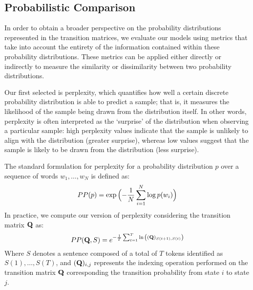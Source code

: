 \subsection{Probabilistic Comparison}\label{ssec:method_fom_prob}

In order to obtain a broader perspective on the probability distributions represented in the transition matrices, we evaluate our models using metrics that take into account the entirety of the information contained within these probability distributions.
These metrics can be applied either directly or indirectly to measure the similarity or dissimilarity between two probability distributions.

Our first selected is perplexity, which quantifies how well a certain discrete probability distribution is able to predict a sample; that is, it measures the likelihood of the sample being drawn from the distribution itself.
In other words, perplexity is often interpreted as the `surprise' of the distribution when observing a particular sample: high perplexity values indicate that the sample is unlikely to align with the distribution (greater surprise), whereas low values suggest that the sample is likely to be drawn from the distribution (less surprise).

The standard formulation for perplexity for a probability distribution $p$ over a sequence of words $w_1,\dots,w_N$ is defined as:
\begin{equation}
    \label{eq:method_fom_perplexity-base}
    PP(p) = \exp{\Bigl(-\frac{1}{N}\sum_{i=1}^{N}{\log{p(w_i)}}\Bigr)}
\end{equation}
In practice, we compute our version of perplexity considering the transition matrix $\bm{\mathbf{Q}}$ as:
\begin{equation}
    \label{eq:method_fom_perplexity}
    PP(\bm{\mathbf{Q}}, S) = e^{-\frac{1}{T}\sum_{t=1}^{T}{\ln{\left((\bm{\mathbf{Q}})_{S(t+1),S(t)}\right)}}}
\end{equation}
Where $S$ denotes a sentence composed of a total of $T$ tokens identified as $S(1),\dots,S(T)$, and $(\bm{\mathbf{Q}})_{i,j}$ represents the indexing operation performed on the transition matrix $\bm{\mathbf{Q}}$ corresponding the transition probability from state $i$ to state $j$.


